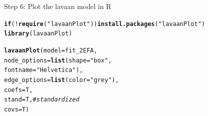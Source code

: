 \documentclass[10pt]{beamer}\usepackage[]{graphicx}\usepackage[]{xcolor}
\makeatletter
\newcommand{\hlstr}[1]{\textcolor[rgb]{0.192,0.494,0.8}{#1}}%
\newcommand{\hlcom}[1]{\textcolor[rgb]{0.678,0.584,0.686}{\textit{#1}}}%
\newcommand{\hlopt}[1]{\textcolor[rgb]{0,0,0}{#1}}%
\newcommand{\hlstd}[1]{\textcolor[rgb]{0.345,0.345,0.345}{#1}}%
\newcommand{\hlkwa}[1]{\textcolor[rgb]{0.161,0.373,0.58}{\textbf{#1}}}%
\newcommand{\hlkwc}[1]{\textcolor[rgb]{0.333,0.667,0.333}{#1}}%
\newcommand{\hlkwd}[1]{\textcolor[rgb]{0.737,0.353,0.396}{\textbf{#1}}}%
\newenvironment{kframe}{%
 \def\at@end@of@kframe{}%
 \ifinner\ifhmode%
  \def\at@end@of@kframe{\end{minipage}}%
  \begin{minipage}{\columnwidth}%
 \fi\fi%
 \def\FrameCommand##1{\hskip\@totalleftmargin \hskip-\fboxsep
 \colorbox{shadecolor}{##1}\hskip-\fboxsep
     \hskip-\linewidth \hskip-\@totalleftmargin \hskip\columnwidth}%
 \MakeFramed {\advance\hsize-\width
   \@totalleftmargin\z@ \linewidth\hsize
   \@setminipage}}%
 {\par\unskip\endMakeFramed%
 \at@end@of@kframe}
\newenvironment{knitrout}{}{} %
\makeatother
\begin{document}
\begin{frame}[fragile]{Step 6: Plot the lavaan model in R}

\begin{knitrout}
\color{fgcolor}\begin{kframe}
\begin{alltt}
\hlkwa{if} \hlstd{(}\hlopt{!}\hlkwd{require}\hlstd{(}\hlstr{"lavaanPlot"}\hlstd{))} \hlkwd{install.packages}\hlstd{(}\hlstr{"lavaanPlot"}\hlstd{)}
\hlkwd{library}\hlstd{(lavaanPlot)}
\end{alltt}
\end{kframe}
\end{knitrout}
\begin{knitrout}
\color{fgcolor}\begin{kframe}
\begin{alltt}
\hlkwd{lavaanPlot}\hlstd{(}\hlkwc{model} \hlstd{= fit_2EFA,}
           \hlkwc{node_options} \hlstd{=} \hlkwd{list}\hlstd{(}\hlkwc{shape} \hlstd{=} \hlstr{"box"}\hlstd{,}
                               \hlkwc{fontname} \hlstd{=} \hlstr{"Helvetica"}\hlstd{),}
           \hlkwc{edge_options} \hlstd{=} \hlkwd{list}\hlstd{(}\hlkwc{color} \hlstd{=} \hlstr{"grey"}\hlstd{),}
           \hlkwc{coefs} \hlstd{= T,}
           \hlkwc{stand} \hlstd{= T,} \hlcom{# standardized }
           \hlkwc{covs} \hlstd{= T)}
\end{alltt}
\end{kframe}
\end{knitrout}
\end{frame}
%
\end{document}
